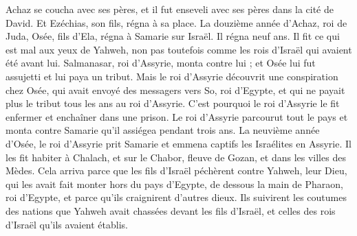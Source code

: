 \begin{multicols}{2}
Achaz se coucha avec ses pères, et il fut enseveli avec ses pères dans la cité de David. Et Ezéchias, son fils, régna à sa place.
\VerseOne{}La douzième année d'Achaz, roi de Juda, Osée, fils d'Ela, régna à Samarie sur Israël. Il régna neuf ans.
Il fit ce qui est mal aux yeux de Yahweh, non pas toutefois comme les rois d'Israël qui avaient été avant lui.
Salmanasar, roi d'Assyrie, monta contre lui ; et Osée lui fut assujetti et lui paya un tribut.
Mais le roi d'Assyrie découvrit une conspiration chez Osée, qui avait envoyé des messagers vers So, roi d'Egypte, et qui ne payait plus le tribut tous les ans au roi d'Assyrie. C'est pourquoi le roi d'Assyrie le fit enfermer et enchaîner dans une prison.
Le roi d'Assyrie parcourut tout le pays et monta contre Samarie qu'il assiégea pendant trois ans.
La neuvième année d'Osée, le roi d'Assyrie prit Samarie et emmena captifs les Israélites en Assyrie. Il les fit habiter à Chalach, et sur le Chabor, fleuve de Gozan, et dans les villes des Mèdes.
Cela arriva parce que les fils d'Israël péchèrent contre Yahweh, leur Dieu, qui les avait fait monter hors du pays d'Egypte, de dessous la main de Pharaon, roi d'Egypte, et parce qu'ils craignirent d'autres dieux.
Ils suivirent les coutumes des nations que Yahweh avait chassées devant les fils d'Israël, et celles des rois d'Israël qu'ils avaient établis.

\end{multicols}
